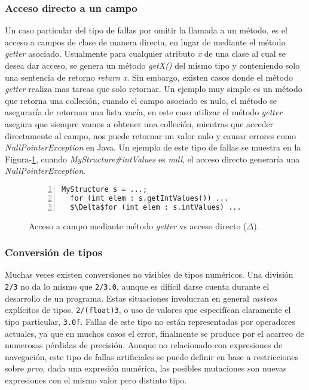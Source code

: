 \subsubsection{Acceso directo a un campo}

Un caso particular del tipo de fallas por omitir la llamada a un m\'etodo, es el acceso a campos de clase de manera directa, en lugar de mediante el m\'etodo \emph{getter} asociado. Usualmente para cualquier atributo \emph{x} de una clase al cual se desea dar acceso, se genera un m\'etodo \emph{getX()} del mismo tipo y conteniendo solo una sentencia de retorno \emph{return x}. Sin embargo, existen casos donde el m\'etodo \emph{getter} realiza mas tareas que solo retornar. Un ejemplo muy simple es un m\'etodo que retorna una colleci\'on, cuando el campo asociado es nulo, el m\'etodo se asegurar\'ia de retornan una lista vac\'ia, en este caso utilizar el m\'etodo \emph{getter} asegura que siempre vamos a obtener una colleci\'on, mientras que acceder directamente al campo, nos puede retornar un valor nulo y causar errores como \emph{NullPointerException} en Java. Un ejemplo de este tipo de fallas se muestra en la Figura-\ref{figures.examples.getterVsDirectAccess}, cuando \emph{MyStructure\#intValues} es \emph{null}, el acceso directo generar\'ia una \emph{NullPointerException}.

\begin{figure}
	\begin{lstlisting}[frame=single, numbers=left, mathescape=true,framexleftmargin=1.5em]
  MyStructure s = ...;
  for (int elem : s.getIntValues()) ...
  $\Delta$for (int elem : s.intValues) ...
	\end{lstlisting}
	\caption{Acceso a campo mediante m\'etodo \emph{getter} vs acceso directo ($\Delta$).}
	\label{figures.examples.getterVsDirectAccess}
\end{figure}

\subsubsection{Conversi\'on de tipos}

Muchas veces existen conversiones no visibles de tipos num\'ericos. Una divisi\'on \texttt{2/3} no da lo mismo que \texttt{2/3.0}, aunque es dif\'icil darse cuenta durante el desarrollo de un programa. Estas situaciones involucran en general \emph{casteos} expl\'icitos de tipos, \texttt{2/(float)3}, o uso de valores que especif\'ican claramente el tipo particular, \texttt{3.0f}. Fallas de este tipo no est\'an representadas por operadores actuales, ya que en muchos casos el error, finalmente se produce por el acarreo de numerosas p\'erdidas de precisi\'on. Aunque no relacionado con expresiones de navegaci\'on, este tipo de fallas artificiales se puede definir en base a restricciones sobre \emph{prvo}, dada una expresi\'on num\'erica, las posibles mutaciones son nuevas expresiones con el mismo valor pero distinto tipo.

